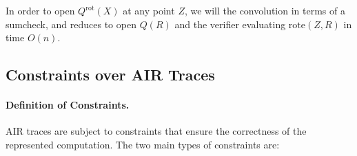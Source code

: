 \documentclass{article}
\begin{document}
In order to open $Q^{\text{rot}}(X)$ at any point $Z$, we will the convolution in terms of a sumcheck, and reduces to open $Q(R)$ and the verifier evaluating $\text{rote}(Z,R)$ in time \(O(n)\).




\subsection{Constraints over AIR Traces}

\paragraph{Definition of Constraints.} AIR traces are subject to constraints that ensure the correctness of the represented computation. The two main types of constraints are:
\end{document}

